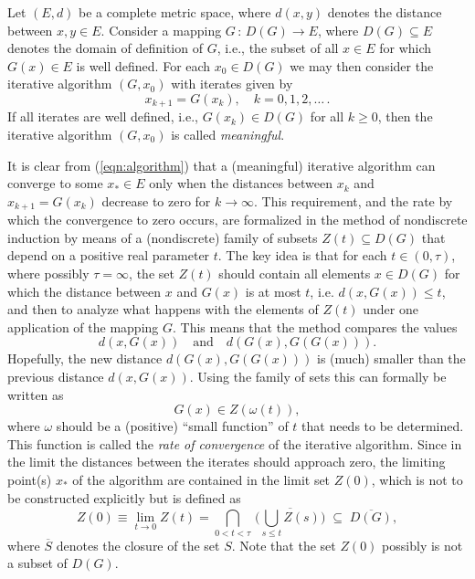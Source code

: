\documentclass{siamltex}
\begin{document}
Let $(E,d)$ be a complete metric space, where $d(x,y)$ denotes the distance
between $x,y\in E$. Consider a mapping $G\,:\,D(G)\rightarrow E$,
where $D(G)\subseteq E$ denotes the domain of definition of $G$, i.e., the subset of all
$x\in E$ for which $G(x)\in E$ is well defined. For each $x_0\in D(G)$ we
may then consider the iterative algorithm $(G,x_0)$ with iterates given by
\begin{equation}\label{eqn:algorithm}
x_{k+1} = G(x_k),\quad k=0,1,2,\dots\,.
\end{equation}
If all iterates are well defined, i.e., $G(x_k)\in D(G)$ for all $k\geq 0$, then
the iterative algorithm $(G,x_0)$ is called {\em meaningful}.

It is clear from (\ref{eqn:algorithm}) that a (meaningful) iterative algorithm can converge to
some $x_*\in E$ only when the distances between $x_k$ and $x_{k+1}=G(x_k)$ decrease to
zero for $k\rightarrow \infty$. This requirement, and the rate by which the convergence to zero
occurs, are formalized in the method of nondiscrete induction by means of a (nondiscrete)
family of subsets $Z(t)\subseteq D(G)$ that depend on a positive real parameter $t$. The
key idea is that for each $t\in (0,\tau)$, where possibly $\tau=\infty$, the set $Z(t)$
should contain all elements $x\in D(G)$ for which the distance between $x$ and $G(x)$ is at
most $t$, i.e. $d(x,G(x))\leq t$, and then to analyze what happens with the elements of
$Z(t)$ under one application of the mapping $G$. This means that the method compares the
values
$$d(x,G(x))\quad\mbox{and}\quad d(G(x),G(G(x))).$$
Hopefully, the new distance $d(G(x),G(G(x)))$ is (much) smaller than the previous distance
$d(x,G(x))$. Using the family of sets this can formally be written as
$$G(x)\in Z(\omega(t)),$$
where $\omega$ should be a (positive) ``small function'' of $t$ that needs to be determined.
This function is called the {\em rate of convergence} of the iterative algorithm. Since in
the limit the distances between the iterates should approach zero, the limiting point(s)
$x_*$ of the algorithm are contained in the limit set $Z(0)$, which is not to be constructed
explicitly but is defined as
\begin{equation}\label{eqn:Z0}
Z(0)\equiv \lim_{t\rightarrow 0} Z(t)= \bigcap_{0<t<\tau}\,\bigl(\overline{\bigcup_{s\leq t} Z(s)}\bigr)
\;\subseteq\; \overline{D(G)},
\end{equation}
where $\overline{S}$ denotes the closure of the set $S$. Note that the set $Z(0)$ possibly is not
a subset of $D(G)$.
\end{document}

